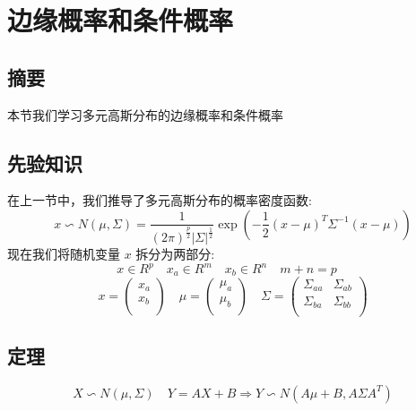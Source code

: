 \documentclass{report}
\begin{document}
\chapter{边缘概率和条件概率}
\section{摘要}
本节我们学习多元高斯分布的边缘概率和条件概率
\section{先验知识}
在上一节中，我们推导了多元高斯分布的概率密度函数:
$$
x \backsim N(\mu, \Sigma) = \frac{1}{(2\pi)^{\frac{p}{2}}|\Sigma|^\frac{1}{2}}\exp(-\frac{1}{2}(x-\mu)^T \Sigma^{-1}(x-\mu))
$$
现在我们将随机变量 $x$ 拆分为两部分:
$$
x \in R^p \quad x_a \in R^m \quad x_b \in R^n \quad m+n=p \quad 
$$
$$
x = 
\left (
\begin{matrix}
x_a \\
x_b \\
\end{matrix}
\right )
\quad 
\mu = 
\left (
\begin{matrix}
\mu_a \\
\mu_b \\
\end{matrix}
\right ) \quad
\Sigma=
\left (
\begin{matrix}
\Sigma_{aa} & \Sigma_{ab}\\
\Sigma_{ba} & \Sigma_{bb}\\
\end{matrix}
\right )
$$
\section{定理}
$$
X \backsim N(\mu, \Sigma) \quad Y=AX+B  \Longrightarrow Y \backsim N(A\mu+B, A \Sigma A^T)
$$
\end{document}
